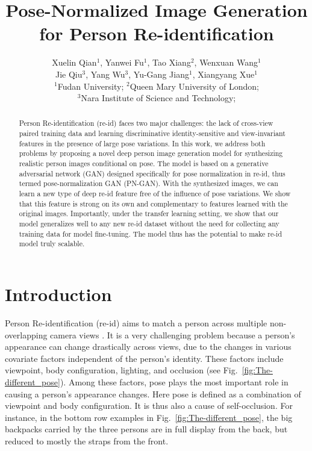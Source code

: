 \documentclass[10pt,letterpaper,twocolumn,10pt,letterpaper,twocolumn]{article}
\begin{document}
\title{Pose-Normalized Image Generation for Person Re-identification}

\author{Xuelin Qian$^{1}$, Yanwei Fu$^{1}$, Tao Xiang$^{2}$,
Wenxuan Wang$^{1}$ \\
Jie Qiu$^{3}$, Yang Wu$^{3}$, Yu-Gang Jiang$^{1}$,
Xiangyang Xue$^{1}$\\
$^{1}$Fudan University; $^{2}$Queen Mary University
of London; \\
$^{3}$Nara Institute of Science and Technology; \\
}
\maketitle
\begin{abstract}
Person Re-identification (re-id) faces two major challenges: the lack
of cross-view paired training data and learning discriminative identity-sensitive
and view-invariant features in the presence of large pose variations.
In this work, we address both problems by proposing a novel deep person
image generation model for synthesizing realistic person images conditional
on pose. The model is based on a generative adversarial network (GAN)
designed specifically for pose normalization in re-id, thus termed
pose-normalization GAN (PN-GAN). With the synthesized images, we can
learn a new type of deep re-id feature free of the influence of pose
variations. We show that this feature is strong on its own and complementary
to features learned with the original images. Importantly, under the
transfer learning setting, we show that our model generalizes well to
any new re-id dataset without the need for collecting any training
data for model fine-tuning. The model thus has the potential to make  re-id
model truly scalable. 
\end{abstract}

\section{Introduction}

Person Re-identification (re-id) aims to match a person across multiple
non-overlapping camera views \cite{gong2011person}. It is a very
challenging problem because a person's appearance can change drastically
across views, due to the changes in various covariate factors independent
of the person's identity. These factors include viewpoint, body configuration,
lighting, and occlusion (see Fig.~\ref{fig:The-different_pose}).
Among these factors, pose plays the most important role in causing
a person's appearance changes. Here pose is defined as a combination
of viewpoint and body configuration. It is thus also a cause of self-occlusion.
For instance, in the bottom row examples in Fig.~\ref{fig:The-different_pose},
the big backpacks carried by the three persons are in full display
from the back, but reduced to mostly the straps from the front.
\end{document}
